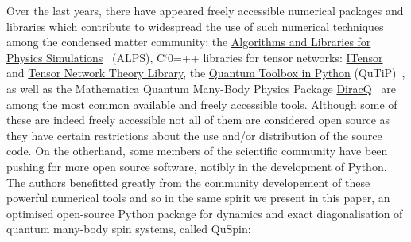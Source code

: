 \documentclass{SciPost}
\newcommand\0{\scalebox{-1}[1]{0}}
\let\svttfamily\ttfamily
\renewcommand\ttfamily{\svttfamily\catcode`0=\active }
\renewcommand\texttt{\bgroup\ttfamily\texttthelp}
\def\texttthelp#1{#1\egroup}
\begin{document}
Over the last years, there have appeared freely accessible numerical packages and libraries which contribute to widespread the use of such numerical techniques among the condensed matter community: the \href{http://alps.comp-phys.org/mediawiki/index.php/Main_Page}{Algorithms and Libraries for Physics Simulations}~\cite{alet05,albuquerque2007,bauer11,dolfi14} (ALPS), C\texttt{++} libraries for tensor networks: \href{http://itensor.org/}{ITensor}~\cite{ITensor} and \href{www.tensornetworktheory.org}{Tensor Network Theory Library}\cite{TNT},  the \href{http://qutip.org/}{Quantum Toolbox in Python} (QuTiP)~\cite{johansson2012,johansson2013}, as well as the Mathematica Quantum Many-Body Physics Package \href{http://diracq.org/}{DiracQ}~\cite{wright_13} are among the most common available and freely accessible tools. Although some of these are indeed freely accessible not all of them are considered open source as they have certain restrictions about the use and/or distribution of the source code. On the otherhand, some members of the scientific community have been pushing for more open source software, notibly in the development of Python. The authors benefitted greatly from the community developement of these powerful numerical tools and so in the same spirit we present in this paper, an optimised open-source Python package for dynamics and exact diagonalisation of quantum many-body spin systems, called QuSpin:
\end{document}
